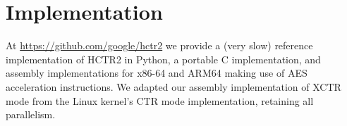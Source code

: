 \documentclass[hctr2.tex]{subfiles}
\begin{document}
\section{Implementation}\label{implementation}
At \url{https://github.com/google/hctr2}
we provide a (very slow) reference implementation of HCTR2 in Python,
a portable C implementation, and assembly implementations for
x86-64 and ARM64 making use of AES acceleration instructions.
We adapted our assembly implementation of XCTR mode from
the Linux kernel's CTR mode implementation, retaining all parallelism.
\end{document}
